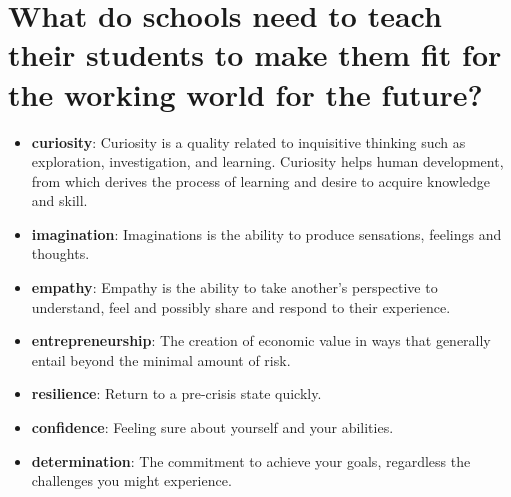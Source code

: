 \documentclass[12pt,a4paper]{report}
\begin{document}
	\section{What do schools need to teach their students to make them fit for the working world for the future?}
	\begin{itemize}
		\item \textbf{curiosity}: Curiosity is a quality related to inquisitive thinking such as exploration, investigation, and learning. Curiosity helps human development, from which derives the process of learning and desire to acquire knowledge and skill.
		\item \textbf{imagination}: Imaginations is the ability to produce sensations, feelings and thoughts.
		\item \textbf{empathy}: Empathy is the ability to take another's perspective to understand, feel and possibly share and respond to their experience.
		\item \textbf{entrepreneurship}: The creation of economic value in ways that generally entail beyond the minimal amount of risk.
		\item \textbf{resilience}: Return to a pre-crisis state quickly.
		\item \textbf{confidence}: Feeling sure about yourself and your abilities.
		\item \textbf{determination}: The commitment to achieve your goals, regardless the challenges you might experience.
	\end{itemize}
\end{document}

